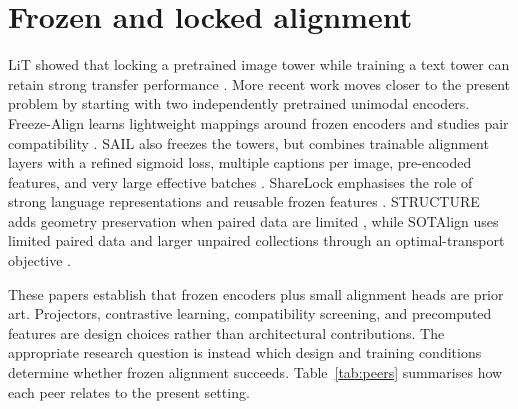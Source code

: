 \documentclass[11pt,a4paper]{article}
\begin{document}
\section{Frozen and locked alignment}

LiT showed that locking a pretrained image tower while training a text tower can
retain strong transfer performance \cite{zhai2022lit}. More recent work moves
closer to the present problem by starting with two independently pretrained
unimodal encoders. Freeze-Align learns lightweight mappings around frozen
encoders and studies pair compatibility \cite{maniparambil2025freezealign}.
SAIL also freezes the towers, but combines trainable alignment layers with a
refined sigmoid loss, multiple captions per image, pre-encoded features, and
very large effective batches \cite{zhang2025sail}. ShareLock emphasises the role
of strong language representations and reusable frozen features
\cite{ruthardt2026sharelock}. STRUCTURE adds geometry preservation when paired
data are limited \cite{groger2025structure}, while SOTAlign uses limited paired
data and larger unpaired collections through an optimal-transport objective
\cite{roschmann2026sotalign}.

These papers establish that frozen encoders plus small alignment heads are
prior art. Projectors, contrastive learning, compatibility screening, and
precomputed features are design choices rather than architectural
contributions. The appropriate research question is instead which design and
training conditions determine whether frozen alignment succeeds.
Table~\ref{tab:peers} summarises how each peer relates to the present setting.
\end{document}
